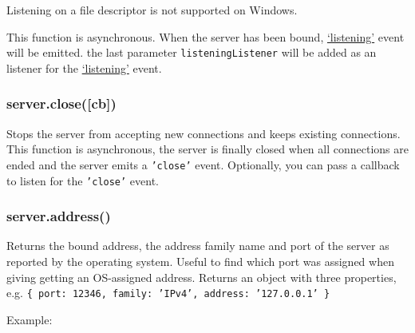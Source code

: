 Listening on a file descriptor is not supported on Windows.

This function is asynchronous. When the server has been bound,
\hyperref[event\_listening\_]{`listening'} event will be emitted. the
last parameter \texttt{listeningListener} will be added as an listener
for the \hyperref[event\_listening\_]{`listening'} event.

\subsubsection{server.close({[}cb{]})}

Stops the server from accepting new connections and keeps existing
connections. This function is asynchronous, the server is finally closed
when all connections are ended and the server emits a \texttt{'close'}
event. Optionally, you can pass a callback to listen for the
\texttt{'close'} event.

\subsubsection{server.address()}

Returns the bound address, the address family name and port of the
server as reported by the operating system. Useful to find which port
was assigned when giving getting an OS-assigned address. Returns an
object with three properties, e.g.
\texttt{\{ port: 12346, family: 'IPv4', address: '127.0.0.1' \}}

Example:

\begin{Shaded}
\end{Shaded}

